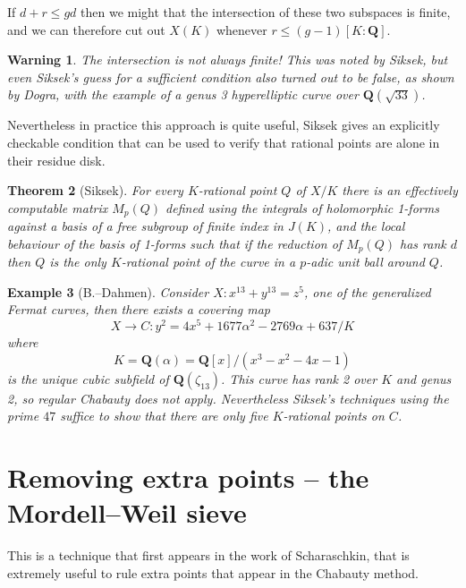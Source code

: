 \documentclass[oneside,11pt,]{article}
\newtheorem{theorem}{Theorem}
\newtheorem{warning}[theorem]{Warning}
\newtheorem{example}[theorem]{Example}
\newcommand{\QQ}{\mathbf{Q}}
\let\emph\relax %
\begin{document}
If \(d + r \le gd \) then we might \emph{hope} that the intersection of these two subspaces is finite, and we can therefore cut out $X(K)$ whenever
\(r \le (g - 1)[K : \QQ]\).

%
\begin{warning}
    The intersection is not always finite! This was noted by Siksek, but even Siksek's guess for a sufficient condition also turned out to be false, as shown by Dogra, with the example of a genus 3 hyperelliptic curve over $\QQ(\sqrt{33})$.
\end{warning}

Nevertheless in practice this approach is quite useful, Siksek gives an explicitly checkable condition that can be used to verify that rational points are alone in their residue disk.

\begin{theorem}[Siksek]
    For every $K$-rational point $Q$ of $X/K$ there is an effectively computable matrix $M_p(Q)$ defined using the integrals of holomorphic 1-forms against a basis of a free subgroup of finite index in $J(K)$, and the local behaviour of the basis of 1-forms such that if the reduction of $M_p(Q)$ has rank $d$ then $Q$ is the only $K$-rational point of the curve in a $p$-adic unit ball around $Q$.
\end{theorem}

\begin{example}[B.--Dahmen]
    Consider \(X\colon  x^{13} + y^{13} = z^5\), one of the generalized Fermat curves, then there exists a covering map
    \[X \to C \colon y^2 = 4 x^5 + 1677 \alpha^2 - 2769 \alpha + 637/K\]
    where
    \[K = \QQ(\alpha ) = \QQ[x]/(x^{3} - x^{2} - 4 x - 1)\]
    is the unique cubic subfield of $\QQ(\zeta _{13})$.
    This curve has rank 2 over $K$ and genus 2, so regular Chabauty does not apply.
    Nevertheless Siksek's techniques using the prime $47$ suffice to show that there are only five $K$-rational points on $C$.
\end{example}


\section{Removing extra points -- the Mordell--Weil sieve}
This is a technique that first appears in the work of Scharaschkin, that is extremely useful to rule extra points that appear in the Chabauty method.
\end{document}
